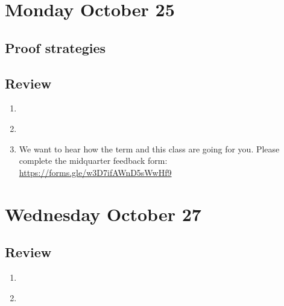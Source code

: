 

\section*{Monday October 25}
\subsection*{Proof strategies}




\newpage





\newpage

\newpage
\subsection*{Review}
\begin{enumerate}
\item \hspace{1in}\\ 
\item \hspace{1in}\\ 
\item We want to hear how the term and this class are going for you.
Please complete the midquarter feedback form: \href{https://forms.gle/w3D7ifAWnD5sWwHf9}{https://forms.gle/w3D7ifAWnD5sWwHf9}
\end{enumerate}

\newpage
\section*{Wednesday October 27}

\newpage


\newpage
\subsection*{Review}
\begin{enumerate}
\item \hspace{1in}\\ 
\item \hspace{1in}\\ 
\end{enumerate}

